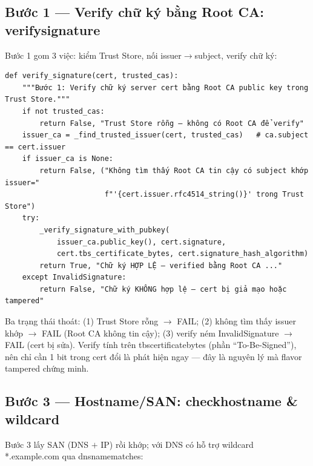 \documentclass[12pt,a4paper]{article}
\newcommand{\code}[1]{{\ttfamily\small\def\_{\textunderscore\discretionary{}{}{}}#1}}
\begin{document}
\subsection{Bước 1 --- Verify chữ ký bằng Root CA: \code{verify\_signature}}

Bước 1 gom 3 việc: kiểm Trust Store, nối issuer$\to$subject, verify chữ ký:

\begin{Verbatim}
def verify_signature(cert, trusted_cas):
    """Bước 1: Verify chữ ký server cert bằng Root CA public key trong Trust Store."""
    if not trusted_cas:
        return False, "Trust Store rỗng — không có Root CA để verify"
    issuer_ca = _find_trusted_issuer(cert, trusted_cas)   # ca.subject == cert.issuer
    if issuer_ca is None:
        return False, ("Không tìm thấy Root CA tin cậy có subject khớp issuer="
                       f"'{cert.issuer.rfc4514_string()}' trong Trust Store")
    try:
        _verify_signature_with_pubkey(
            issuer_ca.public_key(), cert.signature,
            cert.tbs_certificate_bytes, cert.signature_hash_algorithm)
        return True, "Chữ ký HỢP LỆ — verified bằng Root CA ..."
    except InvalidSignature:
        return False, "Chữ ký KHÔNG hợp lệ — cert bị giả mạo hoặc tampered"
\end{Verbatim}

Ba trạng thái thoát: (1) Trust Store rỗng $\to$ FAIL; (2) không tìm thấy issuer
khớp $\to$ FAIL (Root CA không tin cậy); (3) verify ném \code{InvalidSignature}
$\to$ FAIL (cert bị sửa). Verify tính trên \code{tbs\_certificate\_bytes} (phần
``To-Be-Signed''), nên chỉ cần 1 bit trong cert đổi là phát hiện ngay --- đây là
nguyên lý mà flavor \code{tampered} chứng minh.

\subsection{Bước 3 --- Hostname/SAN: \code{check\_hostname} \& wildcard}

Bước 3 lấy SAN (DNS $+$ IP) rồi khớp; với DNS có hỗ trợ wildcard
\code{*.example.com} qua \code{\_dnsname\_matches}:
\end{document}

